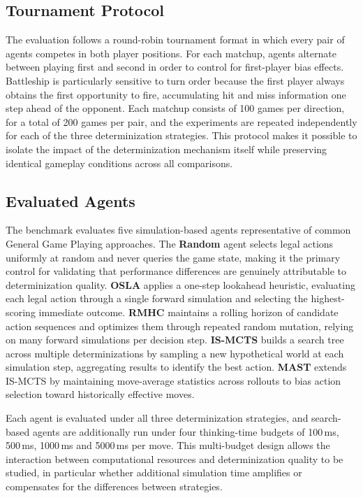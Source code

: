 \subsection{Tournament Protocol}

The evaluation follows a round-robin tournament format in which every pair of agents competes in both player positions. For each matchup, agents alternate between playing first and second in order to control for first-player bias effects. Battleship is particularly sensitive to turn order because the first player always obtains the first opportunity to fire, accumulating hit and miss information one step ahead of the opponent. Each matchup consists of 100 games per direction, for a total of 200 games per pair, and the experiments are repeated independently for each of the three determinization strategies. This protocol makes it possible to isolate the impact of the determinization mechanism itself while preserving identical gameplay conditions across all comparisons.

\subsection{Evaluated Agents}

The benchmark evaluates five simulation-based agents representative of common General Game Playing approaches. The \textbf{Random} agent selects legal actions uniformly at random and never queries the game state, making it the primary control for validating that performance differences are genuinely attributable to determinization quality. \textbf{OSLA} applies a one-step lookahead heuristic, evaluating each legal action through a single forward simulation and selecting the highest-scoring immediate outcome. \textbf{RMHC} maintains a rolling horizon of candidate action sequences and optimizes them through repeated random mutation, relying on many forward simulations per decision step. \textbf{IS-MCTS} builds a search tree across multiple determinizations by sampling a new hypothetical world at each simulation step, aggregating results to identify the best action. \textbf{MAST} extends IS-MCTS by maintaining move-average statistics across rollouts to bias action selection toward historically effective moves.

Each agent is evaluated under all three determinization strategies, and search-based agents are additionally run under four thinking-time budgets of 100\,ms, 500\,ms, 1000\,ms and 5000\,ms per move. This multi-budget design allows the interaction between computational resources and determinization quality to be studied, in particular whether additional simulation time amplifies or compensates for the differences between strategies.

